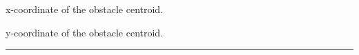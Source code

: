 \documentclass[letterpaper,10pt,english]{sphinxmanual}
\begin{document}
\begin{fulllineitems}
\begin{fulllineitems}
\end{fulllineitems}


\begin{fulllineitems}
\label{Multi-robot motion planner:planning_sim.PolygonObstacle.x}
x-coordinate of the obstacle centroid.

\end{fulllineitems}


\begin{fulllineitems}
\label{Multi-robot motion planner:planning_sim.PolygonObstacle.y}
y-coordinate of the obstacle centroid.

\end{fulllineitems}


\end{fulllineitems}



\bigskip\hrule{}\bigskip

\end{document}
